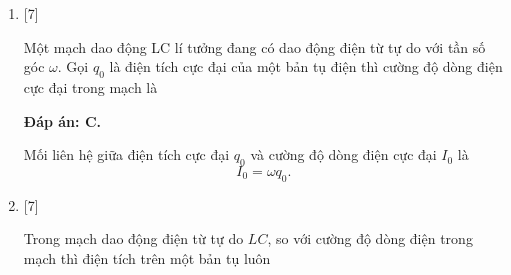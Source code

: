 \begin{enumerate}[label=\bfseries Câu \arabic*:]
	{Trong mạch dao động  $LC$ lí tưởng $L$ và $C$ thay đổi được, muốn giảm tần số dao động riêng của mạch thì có thể
	}
	
	\hideall
	{		\textbf{Đáp án: A.}
		
		Công thức tính tần số dao động riêng là
		$$
		f = \dfrac{1}{2\pi \sqrt{LC}}.
		$$ \\
		Vậy nên, để giảm tần số dao động riêng $f$, ta tăng $C$ và giữ nguyên $L$.
	}
	
	\item {} [7] %
	
	{Một mạch dao động LC lí tưởng đang có dao động điện từ tự do với tần số góc $\omega$. Gọi $q_0$ là điện tích cực đại của một bản tụ điện thì cường độ dòng điện cực đại trong mạch là
	}
	
	\hideall
	{		\textbf{Đáp án: C.}
		
		Mối liên hệ giữa điện tích cực đại $q_0$ và cường độ dòng điện cực đại $I_0$ là
		$$
		I_0 = \omega q_0.
		$$
		
	}	
	
	\item {} [7] %
	
	{Trong mạch dao động điện từ tự do $LC$, so với cường độ dòng điện trong mạch thì điện tích trên một bản tụ luôn
	}
	

\end{enumerate}
